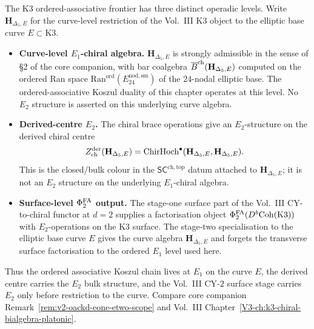 \begin{remark}
\label{rem:oackdf-native-derived}
The K3 ordered-associative frontier has three distinct operadic
levels. Write $\mathbf H_{\Delta_5,E}$ for the curve-level restriction
of the Vol.~III K3 object to the elliptic base curve
$E\subset\mathrm{K3}$.

\begin{itemize}
\item \textbf{Curve-level $E_1$-chiral algebra.} $\mathbf H_{\Delta_5,E}$ is
 strongly admissible in the sense of \S2 of the core companion, with
 bar coalgebra $\overline{B}^{\mathrm{ch}}(\mathbf H_{\Delta_5,E})$ computed on the ordered
 Ran space $\mathrm{Ran}^{\mathrm{ord}}(E^{\mathrm{nod,sm}}_{24})$ of
 the $24$-nodal elliptic base. The ordered-associative Koszul duality
 of this chapter operates at this level. No $E_2$ structure is asserted
 on this underlying curve algebra.
\item \textbf{Derived-centre $E_2$.} The chiral brace operations give
 an $E_2$-structure on the derived chiral centre
 \[
  Z^{\mathrm{der}}_{\mathrm{ch}}(\mathbf H_{\Delta_5,E})
  =
  \mathrm{ChirHoch}^\bullet(\mathbf H_{\Delta_5,E},
  \mathbf H_{\Delta_5,E}).
 \]
 This is the closed/bulk colour in the
 $\mathsf{SC}^{\mathrm{ch,top}}$ datum attached to
 $\mathbf H_{\Delta_5,E}$; it is not an $E_2$ structure on the
 underlying $E_1$-chiral algebra.
\item \textbf{Surface-level $\Phi^{\mathrm{FA}}_2$ output.} The stage-one surface
 part of the Vol.~III CY-to-chiral functor at $d = 2$ supplies a
 factorisation object
 $\Phi^{\mathrm{FA}}_2(D^b\mathrm{Coh}(\mathrm{K3}))$ with $E_2$-operations on the
 K3 surface. The stage-two specialisation to the elliptic base curve
 $E$ gives the curve algebra
 $\mathbf H_{\Delta_5,E}$ and forgets the transverse surface
 factorisation to the ordered $E_1$ level used here.
\end{itemize}

Thus the ordered associative Koszul chain lives at $E_1$ on the curve
$E$, the derived centre carries the $E_2$ bulk structure, and the
Vol.~III CY-$2$ surface stage carries $E_2$ only before restriction to the
curve. Compare core companion
Remark~\ref{rem:v2-oackd-eone-etwo-scope} and
Vol.~III Chapter~\ref{V3-ch:k3-chiral-bialgebra-platonic}.
\end{remark}

